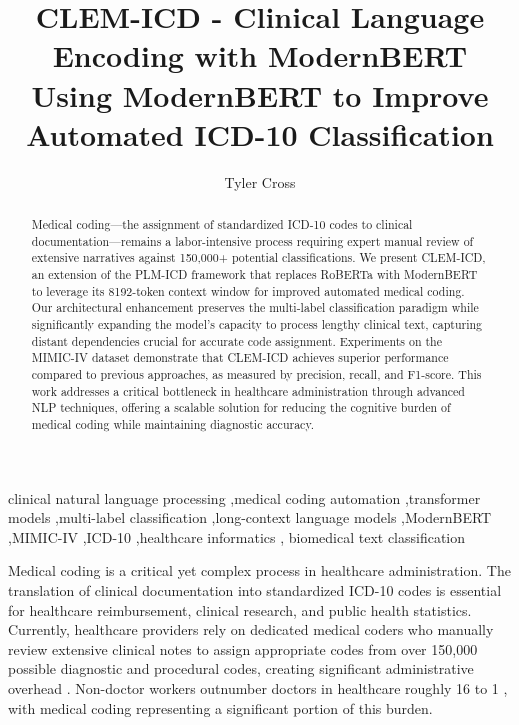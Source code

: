 \documentclass[
  authoryear,
  preprint]{elsarticle}
\begin{document}
\begin{frontmatter}
\title{CLEM-ICD - Clinical Language Encoding with
ModernBERT \\\large{Using ModernBERT to Improve Automated ICD-10
Classification} }
\author[1]{Tyler Cross%
%
}


        
\begin{abstract}
Medical coding---the assignment of standardized ICD-10 codes to clinical
documentation---remains a labor-intensive process requiring expert
manual review of extensive narratives against 150,000+ potential
classifications. We present CLEM-ICD, an extension of the PLM-ICD
framework that replaces RoBERTa with ModernBERT to leverage its
8192-token context window for improved automated medical coding. Our
architectural enhancement preserves the multi-label classification
paradigm while significantly expanding the model's capacity to process
lengthy clinical text, capturing distant dependencies crucial for
accurate code assignment. Experiments on the MIMIC-IV dataset
demonstrate that CLEM-ICD achieves superior performance compared to
previous approaches, as measured by precision, recall, and F1-score.
This work addresses a critical bottleneck in healthcare administration
through advanced NLP techniques, offering a scalable solution for
reducing the cognitive burden of medical coding while maintaining
diagnostic accuracy.
\end{abstract}





\begin{keyword}
    clinical natural language processing \sep medical coding
automation \sep transformer models \sep multi-label
classification \sep long-context language
models \sep ModernBERT \sep MIMIC-IV \sep ICD-10 \sep healthcare
informatics \sep 
    biomedical text classification
\end{keyword}
\end{frontmatter}
    

Medical coding is a critical yet complex process in healthcare
administration. The translation of clinical documentation into
standardized ICD-10 codes is essential for healthcare reimbursement,
clinical research, and public health statistics. Currently, healthcare
providers rely on dedicated medical coders who manually review extensive
clinical notes to assign appropriate codes from over 150,000 possible
diagnostic and procedural codes, creating significant administrative
overhead \citep{tseng2018administrative}. Non-doctor workers outnumber
doctors in healthcare roughly 16 to 1 \citep{kocher2011rethinking}, with
medical coding representing a significant portion of this burden.
\end{document}
